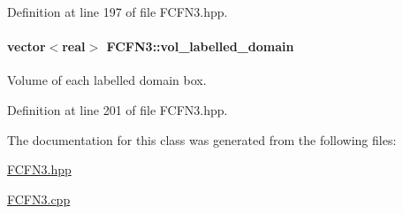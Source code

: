 \-Definition at line 197 of file \-F\-C\-F\-N3.\-hpp.

\hypertarget{classFCFN3_a50eac3a5d427bffc05f729ff3375a0ca}{
\paragraph[{vol\-\_\-labelled\-\_\-domain}]{\setlength{\rightskip}{0pt plus 5cm}vector$<$real$>$ {\bf \-F\-C\-F\-N3\-::vol\-\_\-labelled\-\_\-domain}}}\label{classFCFN3_a50eac3a5d427bffc05f729ff3375a0ca}


\-Volume of each labelled domain box. 



\-Definition at line 201 of file \-F\-C\-F\-N3.\-hpp.



\-The documentation for this class was generated from the following files\-:\begin{DoxyCompactItemize}
\item 
\hyperlink{FCFN3_8hpp}{\-F\-C\-F\-N3.\-hpp}\item 
\hyperlink{FCFN3_8cpp}{\-F\-C\-F\-N3.\-cpp}\end{DoxyCompactItemize}
